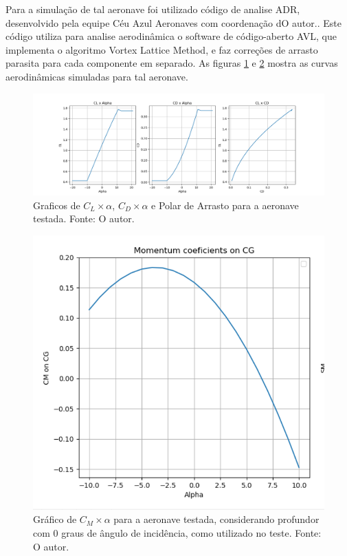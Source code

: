 Para a simulação de tal aeronave foi utilizado código de analise ADR, desenvolvido pela equipe Céu Azul Aeronaves com coordenação dO autor.. Este código utiliza para analise aerodinâmica o software de código-aberto AVL, que implementa o algoritmo Vortex Lattice Method, e faz correções de arrasto parasita para cada componente em separado. As figuras \ref{fig:adr_resultados_1} e \ref{fig:adr_resultados_2} mostra as curvas aerodinâmicas simuladas para tal aeronave.



\begin{figure}[!ht]
    \centering
    \includegraphics[width=1\linewidth]{figuras/ADR/cl_cd_polar.png}
    \caption{Graficos de $C_L \times \alpha$, $C_D \times \alpha$ e Polar de Arrasto para a aeronave testada. Fonte: O autor.}
    \label{fig:adr_resultados_1}
\end{figure}

\begin{figure}[!ht]
    \centering
    \includegraphics[width=.5\linewidth]{figuras/ADR/cm_alpha_0.png}
    \caption{Gráfico de $C_M \times \alpha$ para a aeronave testada, considerando profundor com 0 graus de ângulo de incidência, como utilizado no teste. Fonte: O autor.}
    \label{fig:adr_resultados_2}
\end{figure}

